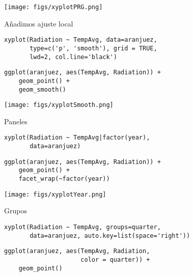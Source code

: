 \documentclass[aspectratio=169, usenames,svgnames,dvipsnames]{beamer}
\begin{document}
\begin{frame}[label={sec:org1045847}]{}
\begin{center}
\texttt{[image: figs/xyplotPRG.png]}
\end{center}
\end{frame}


\begin{frame}[label={sec:orgf6fe697},fragile]{Añadimos ajuste local}
 \lstset{language=r,label= ,caption= ,captionpos=b,numbers=none}
\begin{lstlisting}
xyplot(Radiation ~ TempAvg, data=aranjuez,
       type=c('p', 'smooth'), grid = TRUE,
       lwd=2, col.line='black')
\end{lstlisting}

\lstset{language=r,label= ,caption= ,captionpos=b,numbers=none}
\begin{lstlisting}
ggplot(aranjuez, aes(TempAvg, Radiation)) + 
    geom_point() +
    geom_smooth()
\end{lstlisting}
\end{frame}

\begin{frame}[label={sec:org75d42d8}]{}
\begin{center}
\texttt{[image: figs/xyplotSmooth.png]}
\end{center}
\end{frame}


\begin{frame}[label={sec:orga3e186b},fragile]{Paneles}
 \lstset{language=r,label= ,caption= ,captionpos=b,numbers=none}
\begin{lstlisting}
xyplot(Radiation ~ TempAvg|factor(year),
       data=aranjuez)
\end{lstlisting}

\lstset{language=r,label= ,caption= ,captionpos=b,numbers=none}
\begin{lstlisting}
ggplot(aranjuez, aes(TempAvg, Radiation)) + 
    geom_point() +
    facet_wrap(~factor(year))
\end{lstlisting}
\end{frame}
\begin{frame}[label={sec:org37f7cef}]{}
\begin{center}
\texttt{[image: figs/xyplotYear.png]}
\end{center}
\end{frame}

\begin{frame}[label={sec:org02400df},fragile]{Grupos}
 \lstset{language=r,label= ,caption= ,captionpos=b,numbers=none}
\begin{lstlisting}
xyplot(Radiation ~ TempAvg, groups=quarter,
       data=aranjuez, auto.key=list(space='right'))
\end{lstlisting}

\lstset{language=r,label= ,caption= ,captionpos=b,numbers=none}
\begin{lstlisting}
ggplot(aranjuez, aes(TempAvg, Radiation,
                     color = quarter)) + 
    geom_point()
\end{lstlisting}
\end{frame}
\end{document}
